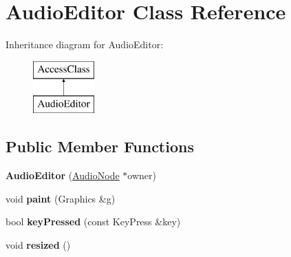 \hypertarget{classAudioEditor}{\section{Audio\-Editor Class Reference}
\label{classAudioEditor}
}
Inheritance diagram for Audio\-Editor\-:\begin{figure}[H]
\begin{center}
\leavevmode
\includegraphics[height=2.000000cm]{classAudioEditor}
\end{center}
\end{figure}
\subsection*{Public Member Functions}
\begin{DoxyCompactItemize}
\item 
\hypertarget{classAudioEditor_a5be323528c200416d7f1e649a7f3bc30}{{\bfseries Audio\-Editor} (\hyperlink{classAudioNode}{Audio\-Node} $\ast$owner)}\label{classAudioEditor_a5be323528c200416d7f1e649a7f3bc30}

\item 
\hypertarget{classAudioEditor_af4aa4c78266e4a539c834a2e14154b90}{void {\bfseries paint} (Graphics \&g)}\label{classAudioEditor_af4aa4c78266e4a539c834a2e14154b90}

\item 
\hypertarget{classAudioEditor_a259636089a665bf4893e91735e524d4c}{bool {\bfseries key\-Pressed} (const Key\-Press \&key)}\label{classAudioEditor_a259636089a665bf4893e91735e524d4c}

\item 
\hypertarget{classAudioEditor_ada2c74ebc9cc51859e04cdc6898acc67}{void {\bfseries resized} ()}\label{classAudioEditor_ada2c74ebc9cc51859e04cdc6898acc67}

\end{DoxyCompactItemize}
